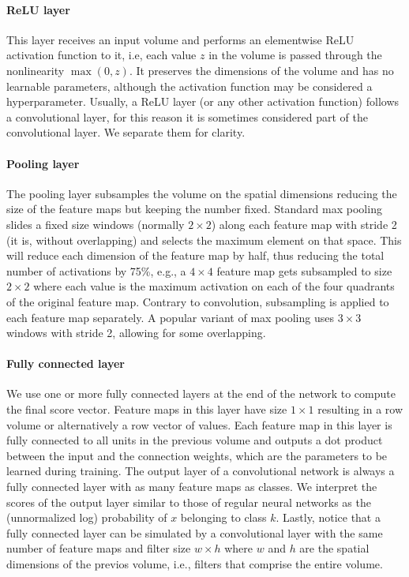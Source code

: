 \paragraph{ReLU layer} This layer receives an input volume and performs an elementwise ReLU activation function to it, i.e, each value $z$ in the volume is passed through the nonlinearity $\max(0,z)$. It preserves the dimensions of the volume and has no learnable parameters, although the activation function may be considered a hyperparameter. Usually, a ReLU layer (or any other activation function) follows a convolutional layer, for this reason it is sometimes considered part of the convolutional layer. We separate them for clarity.

\paragraph{Pooling layer} The pooling layer subsamples the volume on the spatial dimensions reducing the size of the feature maps but keeping the number fixed. Standard max pooling slides a fixed size windows (normally $2\times2$) along each feature map with stride 2 (it is, without overlapping) and selects the maximum element on that space. This will reduce each dimension of the feature map by half, thus reducing the total number of activations by 75\%, e.g., a $4\times4$ feature map gets subsampled to size $2\times 2$ where each value is the maximum activation on each of the four quadrants of the original feature map. Contrary to convolution, subsampling is applied to each feature map separately. A popular variant of max pooling uses $3\times 3$ windows with stride 2, allowing for some overlapping.

\paragraph{Fully connected layer} We use one or more fully connected layers at the end of the network to compute the final score vector. Feature maps in this layer have size $1 \times 1$ resulting in a row volume or alternatively a row vector of values. Each feature map in this layer is fully connected to all units in the previous volume and outputs a dot product between the input and the connection weights, which are the parameters to be learned during training. The output layer of a convolutional network is always a fully connected layer with as many feature maps as classes. We interpret the scores of the output layer similar to those of regular neural networks as the (unnormalized log) probability of $x$ belonging to class $k$. Lastly, notice that a fully connected layer can be simulated by a convolutional layer with the same number of feature maps and filter size $w\times h$ where $w$ and $h$ are the spatial dimensions of the previos volume, i.e., filters that comprise the entire volume.

